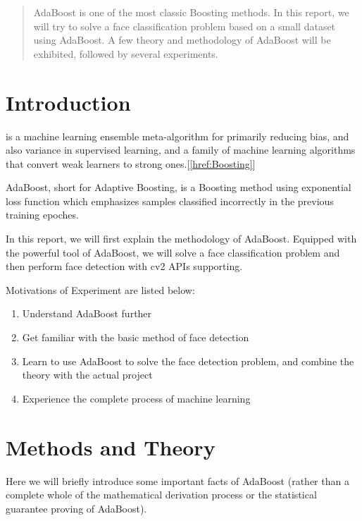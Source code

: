 \documentclass[journal, a4paper, onecolumn]{IEEEtran}
\begin{document}
\begin{multicols}{2}

\begin{abstract}
\begin{bfseries}
AdaBoost is one of the most classic Boosting methods. In this report, we will try to solve a face classification problem based on a small dataset using AdaBoost. A few theory and methodology of AdaBoost will be exhibited, followed by several experiments.  
\end{bfseries}
\end{abstract}

\section{Introduction}
 is a machine learning ensemble meta-algorithm for primarily reducing bias, and also variance in supervised learning, and a family of machine learning algorithms that convert weak learners to strong ones.[\ref{href:Boosting}]

AdaBoost, short for Adaptive Boosting, is a Boosting method using exponential loss function which emphasizes samples classified incorrectly in the previous training epoches. 

In this report, we will first explain the methodology of AdaBoost.
Equipped with the powerful tool of AdaBoost, we will solve a face classification problem and then perform face detection with cv2 APIs supporting.  

Motivations of Experiment are listed below:
    \begin{enumerate}
      \item Understand AdaBoost further
      \item Get familiar with the basic method of face detection
      \item Learn to use AdaBoost to solve the face detection problem, and combine the theory with the actual project
      \item Experience the complete process of machine learning   
    \end{enumerate}

\section{Methods and Theory}
Here we will briefly introduce some important facts of AdaBoost (rather than a complete whole of the mathematical derivation process or the statistical guarantee proving of AdaBoost).


\end{multicols}
\end{document}
